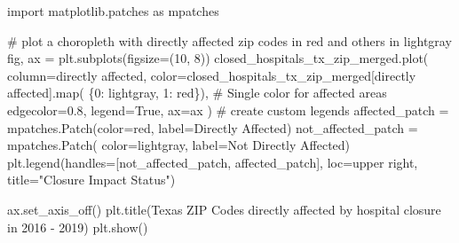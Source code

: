 \documentclass[
  letterpaper,
  DIV=11,
  numbers=noendperiod]{scrartcl}
\newenvironment{Shaded}{\begin{snugshade}}{\end{snugshade}}
\newcommand{\BuiltInTok}[1]{\textcolor[rgb]{0.00,0.23,0.31}{#1}}
\newcommand{\CommentTok}[1]{\textcolor[rgb]{0.37,0.37,0.37}{#1}}
\newcommand{\DecValTok}[1]{\textcolor[rgb]{0.68,0.00,0.00}{#1}}
\newcommand{\ImportTok}[1]{\textcolor[rgb]{0.00,0.46,0.62}{#1}}
\newcommand{\NormalTok}[1]{\textcolor[rgb]{0.00,0.23,0.31}{#1}}
\newcommand{\OperatorTok}[1]{\textcolor[rgb]{0.37,0.37,0.37}{#1}}
\newcommand{\StringTok}[1]{\textcolor[rgb]{0.13,0.47,0.30}{#1}}
\newcommand{\VariableTok}[1]{\textcolor[rgb]{0.07,0.07,0.07}{#1}}
\begin{document}
\begin{Shaded}
\begin{Highlighting}[]
\ImportTok{import}\NormalTok{ matplotlib.patches }\ImportTok{as}\NormalTok{ mpatches}

\CommentTok{\# plot a choropleth with directly affected zip codes in red and others in lightgray}
\NormalTok{fig, ax }\OperatorTok{=}\NormalTok{ plt.subplots(figsize}\OperatorTok{=}\NormalTok{(}\DecValTok{10}\NormalTok{, }\DecValTok{8}\NormalTok{))}
\NormalTok{closed\_hospitals\_tx\_zip\_merged.plot(}
\NormalTok{    column}\OperatorTok{=}\StringTok{\textquotesingle{}directly affected\textquotesingle{}}\NormalTok{,}
\NormalTok{    color}\OperatorTok{=}\NormalTok{closed\_hospitals\_tx\_zip\_merged[}\StringTok{\textquotesingle{}directly affected\textquotesingle{}}\NormalTok{].}\BuiltInTok{map}\NormalTok{(}
\NormalTok{        \{}\DecValTok{0}\NormalTok{: }\StringTok{\textquotesingle{}lightgray\textquotesingle{}}\NormalTok{, }\DecValTok{1}\NormalTok{: }\StringTok{\textquotesingle{}red\textquotesingle{}}\NormalTok{\}),  }\CommentTok{\# Single color for affected areas}
\NormalTok{    edgecolor}\OperatorTok{=}\StringTok{\textquotesingle{}0.8\textquotesingle{}}\NormalTok{,}
\NormalTok{    legend}\OperatorTok{=}\VariableTok{True}\NormalTok{,}
\NormalTok{    ax}\OperatorTok{=}\NormalTok{ax}
\NormalTok{)}
\CommentTok{\# create custom legends}
\NormalTok{affected\_patch }\OperatorTok{=}\NormalTok{ mpatches.Patch(color}\OperatorTok{=}\StringTok{\textquotesingle{}red\textquotesingle{}}\NormalTok{, label}\OperatorTok{=}\StringTok{\textquotesingle{}Directly Affected\textquotesingle{}}\NormalTok{)}
\NormalTok{not\_affected\_patch }\OperatorTok{=}\NormalTok{ mpatches.Patch(}
\NormalTok{    color}\OperatorTok{=}\StringTok{\textquotesingle{}lightgray\textquotesingle{}}\NormalTok{, label}\OperatorTok{=}\StringTok{\textquotesingle{}Not Directly Affected\textquotesingle{}}\NormalTok{)}
\NormalTok{plt.legend(handles}\OperatorTok{=}\NormalTok{[not\_affected\_patch, affected\_patch],}
\NormalTok{           loc}\OperatorTok{=}\StringTok{\textquotesingle{}upper right\textquotesingle{}}\NormalTok{, title}\OperatorTok{=}\StringTok{"Closure Impact Status"}\NormalTok{)}

\NormalTok{ax.set\_axis\_off()}
\NormalTok{plt.title(}\StringTok{\textquotesingle{}Texas ZIP Codes directly affected by hospital closure in 2016 {-} 2019\textquotesingle{}}\NormalTok{)}
\NormalTok{plt.show()}
\end{Highlighting}
\end{Shaded}
\end{document}
